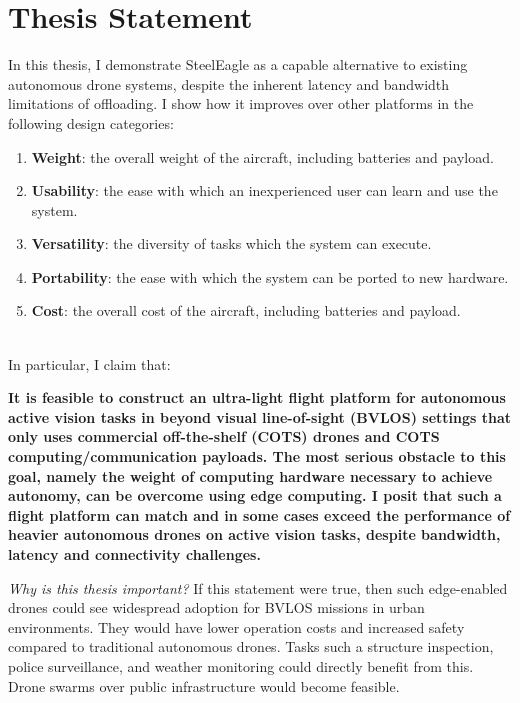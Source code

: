\section{Thesis Statement}
In this thesis, I demonstrate SteelEagle as a capable alternative to existing autonomous drone systems, despite the inherent latency and bandwidth limitations of offloading. I show how it improves over other platforms in the following design categories:

\begin{enumerate}
\item \textbf{Weight}: the overall weight of the aircraft, including batteries and payload.
\item \textbf{Usability}: the ease with which an inexperienced user can learn and use the system. 
\item \textbf{Versatility}: the diversity of tasks which the system can execute.
\item \textbf{Portability}: the ease with which the system can be ported to new hardware.
\item \textbf{Cost}: the overall cost of the aircraft, including batteries and payload.
\end{enumerate}
\\
In particular, I claim that:

\textbf{It is feasible to construct an ultra-light flight platform for autonomous active vision tasks in beyond visual line-of-sight (BVLOS) settings that only uses commercial off-the-shelf (COTS) drones and COTS computing/communication payloads. The most serious obstacle to this goal, namely the weight of computing hardware necessary to achieve autonomy, can be overcome using edge computing. I posit that such a flight platform can match and in some cases exceed the performance of heavier autonomous drones on active vision tasks, despite bandwidth, latency and connectivity challenges.}

\textit{Why is this thesis important?} If this statement were true, then such edge-enabled drones could see widespread adoption for BVLOS missions in urban environments. They would have lower operation costs and increased safety compared to traditional autonomous drones. Tasks such a structure inspection, police surveillance, and weather monitoring could directly benefit from this. Drone swarms over public infrastructure would become feasible.

